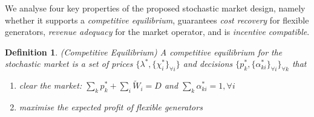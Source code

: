 \documentclass{article}
\newtheorem{definition}{Definition}
\begin{document}
We analyse four key properties of the proposed stochastic market design, namely whether it supports a \textit{competitive equilibrium}, guarantees \textit{cost recovery} for flexible generators, \textit{revenue adequacy} for the market operator, and is \textit{incentive compatible}.

\begin{definition}
(Competitive Equilibrium) A competitive equilibrium for the stochastic market is a set of prices $\{\lambda^*, \{\chi_i^*\}_{\forall i}\}$ and decisions $\{p_k^*, \{\alpha_{ki}^*\}_{\forall i}\}_{\forall k}$ that\vspace{-5pt}
\begin{enumerate}
\item clear the market: $\sum_k p_k^* + \sum_i \tilde{W}_i = D$ and $\sum_k \alpha_{ki}^* = 1, \forall i$\vspace{-5pt}
\item maximise the expected profit of flexible generators
\end{enumerate}
\end{definition}
\end{document}
